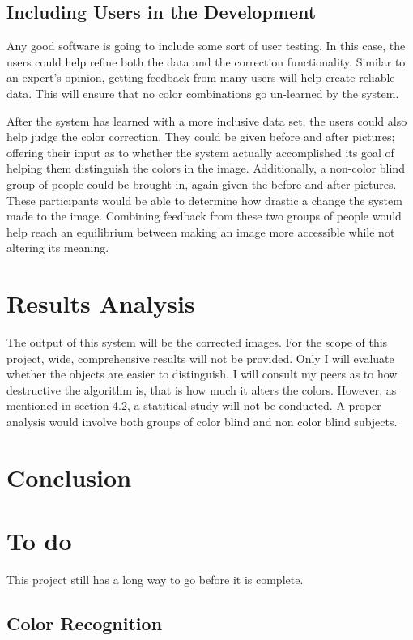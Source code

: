 \documentclass[12pt]{article}
\begin{document}
\subsection{Including Users in the Development}
Any good software is going to include some sort of user testing. In this case, the users could help refine both the data and the correction functionality. Similar to an expert's opinion, getting feedback from many users will help create reliable data. This will ensure that no color combinations go un-learned by the system. 

After the system has learned with a more inclusive data set, the users could also help judge the color correction. They could be given before and after pictures; offering their input as to whether the system actually accomplished its goal of helping them distinguish the colors in the image. Additionally, a non-color blind group of people could be brought in, again given the before and after pictures. These participants would be able to determine how drastic a change the system made to the image. Combining feedback from these two groups of people would help reach an equilibrium between making an image more accessible while not altering its meaning.


\section{Results Analysis}

The output of this system will be the corrected images. For the scope of this project, wide, comprehensive results will not be provided. Only I will evaluate whether the objects are easier to distinguish. I will consult my peers as to how destructive the algorithm is, that is how much it alters the colors. However, as mentioned in section 4.2, a statitical study will not be conducted. A proper analysis would involve both groups of color blind and non color blind subjects. 

\section{Conclusion}


\section{To do}
This project still has a long way to go before it is complete.

\subsection{Color Recognition}
\end{document}
